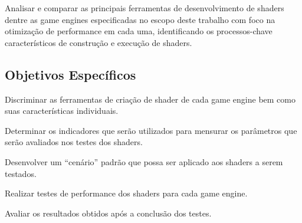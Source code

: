 Analisar e comparar as principais ferramentas de desenvolvimento de shaders dentre as game engines especificadas no escopo deste trabalho com foco na otimização de performance em cada uma, identificando os processos-chave característicos de construção e execução de shaders.

\subsection{Objetivos Específicos}
\label{sec:objetivos-especificos}

	\begin{alineas}
		\item Discriminar as ferramentas de criação de shader de cada game engine bem como suas características individuais.
		\item Determinar os indicadores que serão utilizados para mensurar os parâmetros que serão avaliados nos testes dos shaders.
		\item Desenvolver um “cenário” padrão que possa ser aplicado aos shaders a serem testados.
		\item Realizar testes de performance dos shaders para cada game engine.
		\item Avaliar os resultados obtidos após a conclusão dos testes.
	\end{alineas}